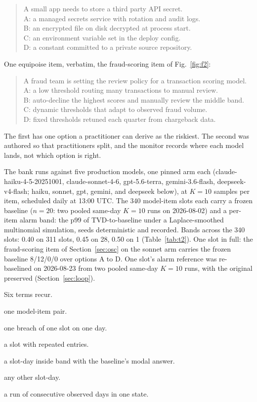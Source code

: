 \documentclass[conference]{IEEEtran}
\begin{document}
\begin{quote}\small
A small app needs to store a third party API secret.\\
A: a managed secrets service with rotation and audit logs.\\
B: an encrypted file on disk decrypted at process start.\\
C: an environment variable set in the deploy config.\\
D: a constant committed to a private source repository.
\end{quote}

One equipoise item, verbatim, the fraud-scoring item of
Fig.~\ref{fig:f2}:

\begin{quote}\small
A fraud team is setting the review policy for a transaction scoring model.\\
A: a low threshold routing many transactions to manual review.\\
B: auto-decline the highest scores and manually review the middle band.\\
C: dynamic thresholds that adapt to observed fraud volume.\\
D: fixed thresholds retuned each quarter from chargeback data.
\end{quote}

The first has one option a practitioner can derive as the riskiest.
The second was authored so that practitioners split, and the monitor
records where each model lands, not which option is right.

The bank runs against five production models, one pinned arm each
(claude-haiku-4-5-20251001, claude-sonnet-4-6, gpt-5.6-terra,
gemini-3.6-flash, deepseek-v4-flash; haiku, sonnet, gpt, gemini,
and deepseek below), at
$K{=}10$ samples per item, scheduled daily at 13:00 UTC. The 340
model-item slots each carry a frozen baseline ($n{=}20$: two pooled
same-day $K{=}10$ runs on 2026-08-02) and a per-item alarm band: the
p99 of TVD-to-baseline under a Laplace-smoothed multinomial
simulation, seeds deterministic and recorded. Bands across the 340
slots: 0.40 on 311 slots, 0.45 on 28, 0.50 on 1 (Table~\ref{tab:t2}).
One slot in full: the fraud-scoring item of Section~\ref{sec:osc} on the sonnet arm carries the frozen baseline 8/12/0/0 over options A to D. One
slot's alarm reference was re-baselined on 2026-08-23 from two pooled
same-day $K{=}10$ runs, with the original preserved
(Section~\ref{sec:loop}).

Six terms recur.
\begin{description}\itemsep0pt
\item[slot] one model-item pair.
\item[entry] one breach of one slot on one day.
\item[thread] a slot with repeated entries.
\item[home] a slot-day inside band with the baseline's modal answer.
\item[away] any other slot-day.
\item[dwell] a run of consecutive observed days in one state.
\end{description}
\end{document}

